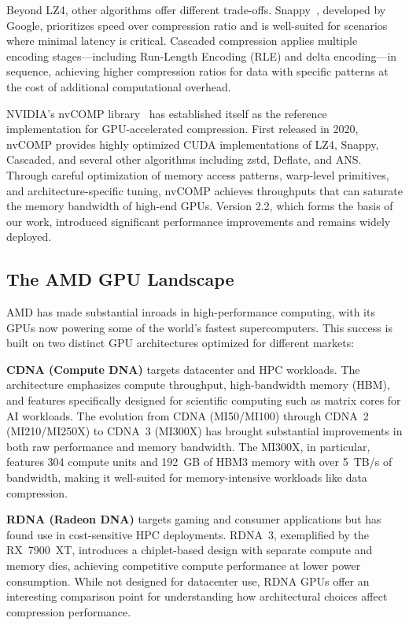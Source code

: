 \documentclass[runningheads]{llncs}
\begin{document}
Beyond LZ4, other algorithms offer different trade-offs. Snappy~\cite{snappy}, developed by Google, prioritizes speed over compression ratio and is well-suited for scenarios where minimal latency is critical. Cascaded compression applies multiple encoding stages---including Run-Length Encoding (RLE) and delta encoding---in sequence, achieving higher compression ratios for data with specific patterns at the cost of additional computational overhead.

NVIDIA's nvCOMP library~\cite{nvcomp} has established itself as the reference implementation for GPU-accelerated compression. First released in 2020, nvCOMP provides highly optimized CUDA implementations of LZ4, Snappy, Cascaded, and several other algorithms including zstd, Deflate, and ANS. Through careful optimization of memory access patterns, warp-level primitives, and architecture-specific tuning, nvCOMP achieves throughputs that can saturate the memory bandwidth of high-end GPUs. Version 2.2, which forms the basis of our work, introduced significant performance improvements and remains widely deployed.

\subsection{The AMD GPU Landscape}

AMD has made substantial inroads in high-performance computing, with its GPUs now powering some of the world's fastest supercomputers. This success is built on two distinct GPU architectures optimized for different markets:

\textbf{CDNA (Compute DNA)} targets datacenter and HPC workloads. The architecture emphasizes compute throughput, high-bandwidth memory (HBM), and features specifically designed for scientific computing such as matrix cores for AI workloads. The evolution from CDNA (MI50/MI100) through CDNA~2 (MI210/MI250X) to CDNA~3 (MI300X) has brought substantial improvements in both raw performance and memory bandwidth. The MI300X, in particular, features 304 compute units and 192~GB of HBM3 memory with over 5~TB/s of bandwidth, making it well-suited for memory-intensive workloads like data compression.

\textbf{RDNA (Radeon DNA)} targets gaming and consumer applications but has found use in cost-sensitive HPC deployments. RDNA~3, exemplified by the RX~7900~XT, introduces a chiplet-based design with separate compute and memory dies, achieving competitive compute performance at lower power consumption. While not designed for datacenter use, RDNA GPUs offer an interesting comparison point for understanding how architectural choices affect compression performance.
\end{document}
